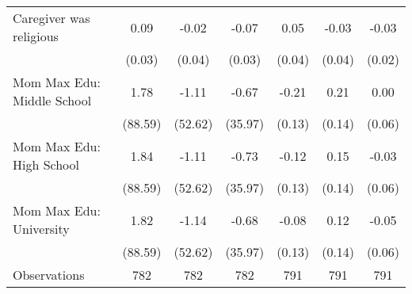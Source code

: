 {\begin{tabular}{l*{6}{c}}
\addlinespace
Caregiver was religious&        0.09\sym{**} &       -0.02         &       -0.07\sym{*}  &        0.05         &       -0.03         &       -0.03         \\
                    &      (0.03)         &      (0.04)         &      (0.03)         &      (0.04)         &      (0.04)         &      (0.02)         \\
\addlinespace
Mom Max Edu: Middle School&        1.78         &       -1.11         &       -0.67         &       -0.21         &        0.21         &        0.00         \\
                    &     (88.59)         &     (52.62)         &     (35.97)         &      (0.13)         &      (0.14)         &      (0.06)         \\
\addlinespace
Mom Max Edu: High School&        1.84         &       -1.11         &       -0.73         &       -0.12         &        0.15         &       -0.03         \\
                    &     (88.59)         &     (52.62)         &     (35.97)         &      (0.13)         &      (0.14)         &      (0.06)         \\
\addlinespace
Mom Max Edu: University&        1.82         &       -1.14         &       -0.68         &       -0.08         &        0.12         &       -0.05         \\
                    &     (88.59)         &     (52.62)         &     (35.97)         &      (0.13)         &      (0.14)         &      (0.06)         \\
\midrule
Observations        &         782         &         782         &         782         &         791         &         791         &         791         \\
\bottomrule
\end{tabular}
}
